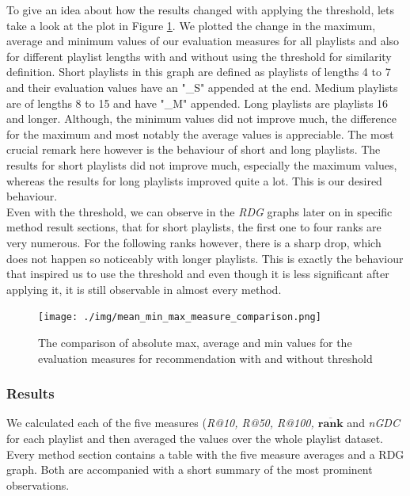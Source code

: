 To give an idea about how the results changed with applying the threshold, lets take a look at the plot in Figure \ref{fig:absolute_value_comparison}. We plotted the change in the maximum, average and minimum values of our evaluation measures for all playlists and also for different playlist lengths with and without using the threshold for similarity definition. Short playlists in this graph are defined as playlists of lengths 4 to 7 and their evaluation values have an "\_S" appended at the end. Medium playlists are of lengths 8 to 15 and have "\_M" appended. Long playlists are playlists 16 and longer. Although, the minimum values did not improve much, the difference for the maximum and most notably the average values is appreciable. The most crucial remark here however is the behaviour of short and long playlists. The results for short playlists did not improve much, especially the maximum values, whereas the results for long playlists improved quite a lot. This is our desired behaviour. \\
Even with the threshold, we can observe in the \textit{RDG} graphs later on in specific method result sections, that for short playlists, the first one to four ranks are very numerous. For the following ranks however, there is a sharp drop, which does not happen so noticeably with longer playlists. This is exactly the behaviour that inspired us to use the threshold and even though it is less significant after applying it, it is still observable in almost every method. \\

\begin{figure}[h!]
    \centering
	\texttt{[image: ./img/mean\_min\_max\_measure\_comparison.png]}
	\caption{The comparison of absolute max, average and min values for the evaluation measures for recommendation with and without threshold}
	\label{fig:absolute_value_comparison}
\end{figure}


\subsubsection{Results}

We calculated each of the five measures (\textit{R@10, R@50, R@100, $ \boldsymbol{\overline{rank}} $} and \textit{nGDC} for each playlist and then averaged the values over the whole playlist dataset. Every method section contains a table with the five measure averages and a RDG graph. Both are accompanied with a short summary of the most prominent observations.


